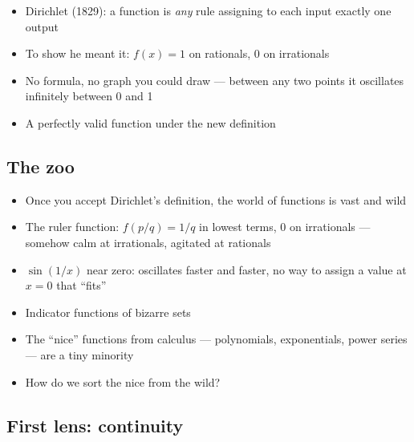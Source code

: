 \documentclass[
  10pt,
  letterpaper,
]{scrbook}
\providecommand{\tightlist}{%
  \setlength{\itemsep}{0pt}\setlength{\parskip}{0pt}}
\begin{document}
\begin{itemize}
\tightlist
\item
  Dirichlet (1829): a function is \emph{any} rule assigning to each
  input exactly one output
\item
  To show he meant it: \(f(x) = 1\) on rationals, \(0\) on irrationals
\item
  No formula, no graph you could draw --- between any two points it
  oscillates infinitely between 0 and 1
\item
  A perfectly valid function under the new definition
\end{itemize}

\subsection*{The zoo}\label{the-zoo}

\begin{itemize}
\tightlist
\item
  Once you accept Dirichlet's definition, the world of functions is vast
  and wild
\item
  The ruler function: \(f(p/q) = 1/q\) in lowest terms, \(0\) on
  irrationals --- somehow calm at irrationals, agitated at rationals
\item
  \(\sin(1/x)\) near zero: oscillates faster and faster, no way to
  assign a value at \(x = 0\) that ``fits''
\item
  Indicator functions of bizarre sets
\item
  The ``nice'' functions from calculus --- polynomials, exponentials,
  power series --- are a tiny minority
\item
  How do we sort the nice from the wild?
\end{itemize}

\subsection*{First lens: continuity}\label{first-lens-continuity}
\end{document}
